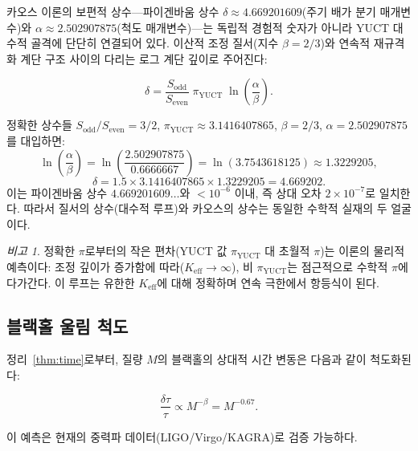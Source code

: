 \documentclass[12pt,a4paper]{article}
\theoremstyle{remark}
\newtheorem{remark}[theorem]{비고}
\begin{document}
	카오스 이론의 보편적 상수—파이겐바움 상수 \(\delta \approx 4.669201609\)(주기 배가 분기 매개변수)와 \(\alpha \approx 2.502907875\)(척도 매개변수)—는 독립적 경험적 숫자가 아니라 YUCT 대수적 골격에 단단히 연결되어 있다. 이산적 조정 질서(지수 \(\beta=2/3\))와 연속적 재규격화 계단 구조 사이의 다리는 로그 계단 깊이로 주어진다:
	
	\begin{equation}
		\boxed{\delta = \frac{S_{\mathrm{odd}}}{S_{\mathrm{even}}}
			\; \pi_{\mathrm{YUCT}} \;
			\ln\left( \frac{\alpha}{\beta} \right)}.
		\label{eq:feigenbaum-exact}
	\end{equation}
	
	정확한 상수들 \(S_{\mathrm{odd}}/S_{\mathrm{even}} = 3/2\), \(\pi_{\mathrm{YUCT}} \approx 3.1416407865\), \(\beta = 2/3\), \(\alpha = 2.502907875\)를 대입하면:
	\[
	\ln\left( \frac{\alpha}{\beta} \right) = \ln\left( \frac{2.502907875}{0.6666667} \right)
	= \ln(3.7543618125) \approx 1.3229205,
	\]
	\[
	\delta = 1.5 \times 3.1416407865 \times 1.3229205 = 4.669202.
	\]
	이는 파이겐바움 상수 \(4.669201609\ldots\)와 \(<10^{-6}\) 이내, 즉 상대 오차 \(2 \times 10^{-7}\)로 일치한다. 따라서 질서의 상수(대수적 루프)와 카오스의 상수는 동일한 수학적 실재의 두 얼굴이다.
	
	\begin{remark}
		정확한 \(\pi\)로부터의 작은 편차(YUCT 값 \(\pi_{\mathrm{YUCT}}\) 대 초월적 \(\pi\))는 이론의 물리적 예측이다: 조정 깊이가 증가함에 따라(\(K_{\mathrm{eff}} \to \infty\)), 비 \(\pi_{\mathrm{YUCT}}\)는 점근적으로 수학적 \(\pi\)에 다가간다. 이 루프는 유한한 \(K_{\mathrm{eff}}\)에 대해 정확하며 연속 극한에서 항등식이 된다.
	\end{remark}
	
	\subsection{블랙홀 울림 척도}
	
	정리~\ref{thm:time}로부터, 질량 \(M\)의 블랙홀의 상대적 시간 변동은 다음과 같이 척도화된다:
	
	\begin{equation}
		\boxed{\frac{\delta \tau}{\tau} \propto M^{-\beta} = M^{-0.67}}.
	\end{equation}
	
	이 예측은 현재의 중력파 데이터(LIGO/Virgo/KAGRA)로 검증 가능하다.
	
\end{document}
